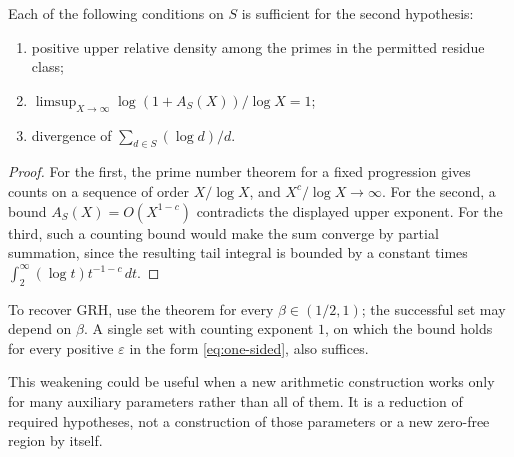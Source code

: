 \begin{corollary}\label{cor:density}
Each of the following conditions on \(S\) is sufficient for the second hypothesis:
\begin{enumerate}
\item positive upper relative density among the primes in the permitted residue class;
\item \(\limsup_{X\to\infty}\log(1+A_S(X))/\log X=1\);
\item divergence of \(\sum_{d\in S}(\log d)/d\).
\end{enumerate}
\end{corollary}

\begin{proof}
For the first, the prime number theorem for a fixed progression gives counts on a sequence of order \(X/\log X\), and \(X^c/\log X\to\infty\). For the second, a bound \(A_S(X)=O(X^{1-c})\) contradicts the displayed upper exponent. For the third, such a counting bound would make the sum converge by partial summation, since the resulting tail integral is bounded by a constant times
\(\int_2^\infty (\log t)t^{-1-c}\,dt\).
\end{proof}

To recover GRH, use the theorem for every \(\beta\in(1/2,1)\); the successful set may depend on \(\beta\). A single set with counting exponent \(1\), on which the bound holds for every positive \(\varepsilon\) in the form \eqref{eq:one-sided}, also suffices.

This weakening could be useful when a new arithmetic construction works only for many auxiliary parameters rather than all of them. It is a reduction of required hypotheses, not a construction of those parameters or a new zero-free region by itself.
